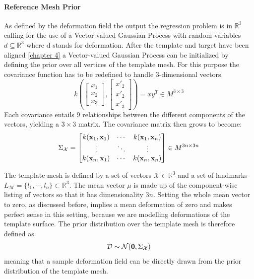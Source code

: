 \paragraph{Reference Mesh Prior}
As defined by the deformation field the output the regression problem is in $\mathbb{R}^3$ calling for the use of a Vector-valued Gaussian Process with random variables $d \subseteq \mathbb{R}^3$ where d stands for deformation. 
After the template and target have been aligned \ref{chapter 4} a Vector-valued Gaussian Process can be initialized by defining the prior over all vertices of the template mesh. For this purpose the covariance function has to be redefined to handle 3-dimensional vectors.
\begin{equation}
    k\left(
    \begin{bmatrix}x_{1}\\x_{2}\\x_{3}\end{bmatrix},
    \begin{bmatrix}x'_{2}\\x'_{2}\\x'_{3}\end{bmatrix}
    \right) = x y^T \in M^{3 \times 3}
\end{equation}
Each covariance entails 9 relationships between the different components of the vectors, yielding a $3 \times 3$ matrix. The covariance matrix then grows to become: 
\begin{equation}
    \Sigma_{\mathcal{X}} = 
\begin{bmatrix}
    k(\textbf{x}_{1},\textbf{x}_{1}) & \cdots & k(\textbf{x}_{1},\textbf{x}_{n}) \\
\vdots & \ddots & \vdots \\
k(\textbf{x}_{n},\textbf{x}_{1}) & \cdots & k(\textbf{x}_{n},\textbf{x}_{n})
\end{bmatrix} \in M^{3n \times 3n}
\end{equation}

The template mesh is defined by a set of vectors $\mathcal{X} \in \mathbb{R}^3$ and a set of landmarks $L_\mathcal{M}=\{l_{1}, \cdots, l_{n}\} \subset \mathbb{R}^3$.
The mean vector $\mu$ is made up of the component-wise listing of vectors so that it has dimensionality $3n$. Setting the whole mean vector to zero, as discussed before, implies a mean deformation of zero and makes perfect sense in this setting, because we are modelling deformations of the template surface. 
The prior distribution over the template mesh is therefore defined as 
\begin{equation}
    \mathcal{D} \sim \mathcal{N}(\textbf{0}, \Sigma_{\mathcal{X}})
\end{equation}
meaning that a sample deformation field can be directly drawn from the prior distribution of the template mesh. 

